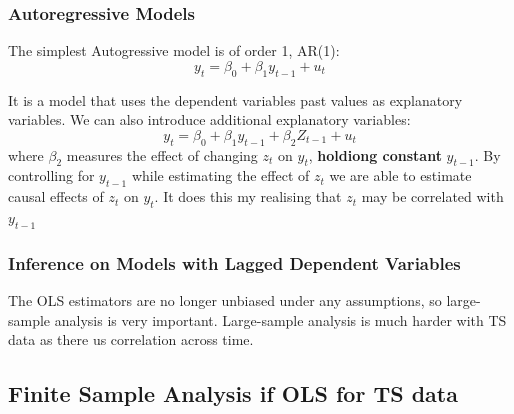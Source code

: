 \documentclass[11pt]{article}
\begin{document}
\subsubsection*{Autoregressive Models}
The simplest Autogressive model is of order 1, AR(1):
\[y_t = \beta_0 + \beta_1 y_{t-1} + u_t\]

It is a model that uses the dependent variables past values as explanatory variables. We can also introduce additional explanatory variables:
\[y_t = \beta_0 + \beta_1 y_{t-1} + \beta_2 Z_{t-1} + u_t\]
where $\beta_2$ measures the effect of changing $z_t$ on $y_t$, \textbf{holdiong constant} $y_{t-1}.$ By controlling for $y_{t-1}$ while estimating the effect of $z_t$ we are able to estimate causal effects of $z_t$ on $y_t$. It does this my realising that $z_t$ may be correlated with $y_{t-1}$

\subsubsection{Inference on Models with Lagged Dependent Variables}

The OLS estimators are no longer unbiased under any assumptions, so large-sample analysis is very important. Large-sample analysis is much harder with TS data as there us correlation across time.

\subsection{Finite Sample Analysis if OLS for TS data}
\end{document}
